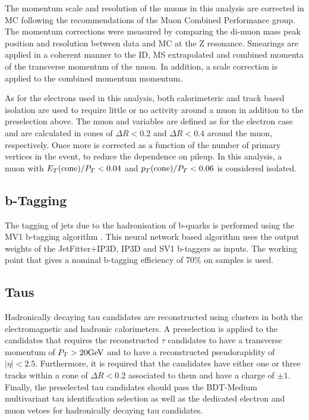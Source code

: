 The momentum scale and resolution of the muons in this analysis are
corrected in MC following the recommendations of the Muon Combined
Performance group. The momentum corrections were measured by comparing
the di-muon mass peak position and resolution between data and MC at
the Z resonance. Smearings are applied in a coherent manner to
the ID, MS extrapolated and combined momenta of the transverse
momentum of the muon. In addition, a scale correction is applied to
the combined momentum momentum.

As for the electrons used in this analysis, both calorimeteric and
track based isolation are used to require little or no activity around a muon
in addition to the preselection above. The muon \etcone and \ptcone
variables are defined as for the electron case and are calculated
in cones of $\Delta R<0.2$ and $\Delta R<0.4$ around the muon, respectively. 
Once more \etcone is corrected as a function of the number of primary vertices in the
event, to reduce the dependence on pileup. In this analysis, a muon with
$E_{T}(\mathrm{cone})/P_{T}<0.04$ and $p_{T}(\mathrm{cone})/P_{T}<0.06$ is considered isolated.



\subsection{b-Tagging}
\label{sec:presel:btag}

The tagging of jets due to the hadronisation of b-quarks is performed
using the MV1 b-tagging algorithm \cite{mv1}. This neural network based
algorithm uses the output weights of the JetFitter+IP3D, IP3D and
SV1 b-taggers as inputs. The working point that gives a nominal
b-tagging efficiency of 70\% on \ttbar samples is used.

\subsection{Taus}
\label{sec:presel:tau}

Hadronically decaying tau candidates are reconstructed using clusters
in both the electromagnetic and hadronic calorimeters. A preselection
is applied to the candidates that requires the reconstructed $\tau$
candidates to have a transverse momentum of $P_{T}>20 \text{GeV}$ and to have
a reconstructed pseudorapidity of $|\eta| < 2.5$. Furthermore, it is
required that the candidates have either one or three tracks within a
cone of $\Delta R < 0.2$ associated to them and have a charge of $\pm
1$. Finally, the preselected tau candidates should pass the BDT-Medium
multivariant tau identification selection as well as the dedicated
electron and muon vetoes for hadronically decaying tau candidates.



